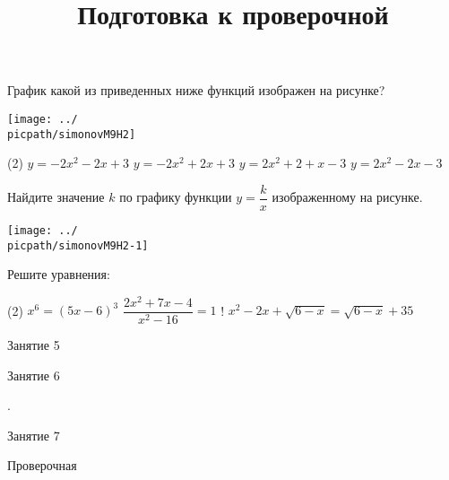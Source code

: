 \begin{homework}[number=2]
	\begin{listofex}
		\item График какой из приведенных ниже функций изображен на рисунке?
		\begin{center}
			\texttt{[image: ../\\picpath/simonovM9H2]}
		\end{center}
		\begin{tasks}(2)
			\task \( y=-2x^2-2x+3 \)
			\task \( y=-2x^2+2x+3 \)
			\task \( y=2x^2+2+x-3 \)
			\task \( y=2x^2-2x-3 \)
		\end{tasks}
		\item Найдите значение \( k \) по графику функции \( y=\dfrac{k}{x} \)  изображенному на рисунке.
		\begin{center}
			\texttt{[image: ../\\picpath/simonovM9H2-1]}
		\end{center}
		\item Решите уравнения:
		\begin{tasks}(2)
			\task \( x^6=(5x-6)^3 \)
			\task \( \dfrac{2x^2+7x-4}{x^2-16}=1 \)
			\task! \( x^2-2x+\sqrt{6-x}=\sqrt{6-x}+35 \)
		\end{tasks}
	\end{listofex}
\end{homework}

\begin{class}[number=5]
	\begin{listofex}
		\item Занятие 5
	\end{listofex}
\end{class}

\begin{class}[number=6]
	\begin{listofex}
		\item Занятие 6
	\end{listofex}
\end{class}

\begin{homework}[number=4]
	\begin{listofex}
		\item .
	\end{listofex}
\end{homework}

\begin{class}[number=7]
	\title{Подготовка к проверочной}
	\begin{listofex}
		\item Занятие 7
	\end{listofex}
\end{class}

\begin{exam}
	\begin{listofex}
		\item Проверочная
	\end{listofex}
\end{exam}
